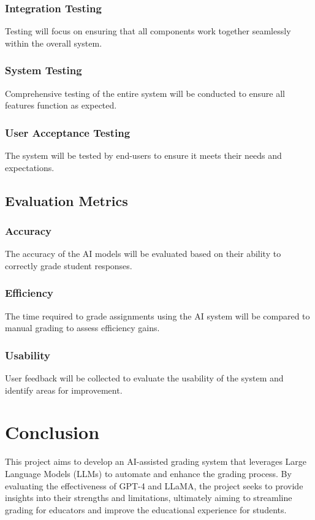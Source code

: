\documentclass[ms,twoside,print]{nuthesis}
\begin{document}
\subsection{Integration Testing}
Testing will focus on ensuring that all components work together seamlessly within the overall system.

\subsection{System Testing}
Comprehensive testing of the entire system will be conducted to ensure all features function as expected.

\subsection{User Acceptance Testing}
The system will be tested by end-users to ensure it meets their needs and expectations.

\section{Evaluation Metrics}
\subsection{Accuracy}
The accuracy of the AI models will be evaluated based on their ability to correctly grade student responses.

\subsection{Efficiency}
The time required to grade assignments using the AI system will be compared to manual grading to assess efficiency gains.

\subsection{Usability}
User feedback will be collected to evaluate the usability of the system and identify areas for improvement.

\chapter{Conclusion}
This project aims to develop an AI-assisted grading system that leverages Large Language Models (LLMs) to automate and enhance the grading process. By evaluating the effectiveness of GPT-4 and LLaMA, the project seeks to provide insights into their strengths and limitations, ultimately aiming to streamline grading for educators and improve the educational experience for students.
\end{document}
